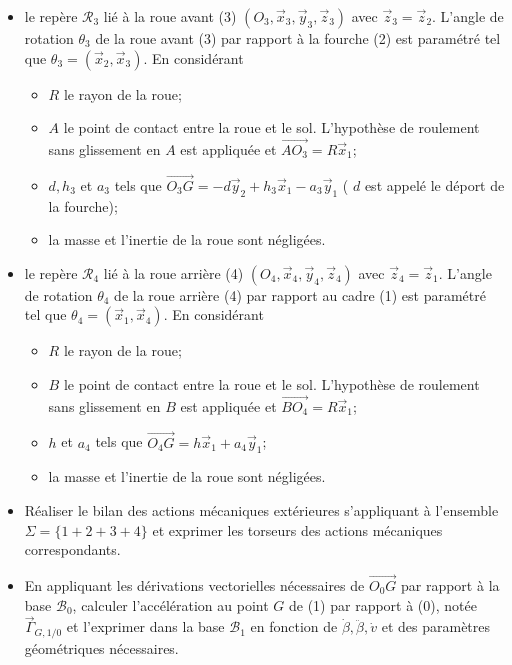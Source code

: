 \documentclass[10pt]{article}
\begin{document}
\begin{itemize}
  \item[-] le repère $\mathcal{R}_{3}$ lié à la roue avant (3) $\left(O_{3}, \vec{x}_{3}, \vec{y}_{3}, \vec{z}_{3}\right)$ avec $\vec{z}_{3}=\vec{z}_{2}$. L'angle de rotation $\theta_{3}$ de la roue avant (3) par rapport à la fourche (2) est paramétré tel que $\theta_{3}=\left(\vec{x}_{2}, \vec{x}_{3}\right)$. En considérant
  \begin{itemize}
    \item[-] $R$ le rayon de la roue;
    \item[-] $A$ le point de contact entre la roue et le sol. L'hypothèse de roulement sans glissement en $A$ est appliquée et $\overrightarrow{A O_{3}}=R \vec{x}_{1}$;
    \item[-] $d, h_{3}$ et $a_{3}$ tels que $\overrightarrow{O_{3} G}=-d \vec{y}_{2}+h_{3} \vec{x}_{1}-a_{3} \vec{y}_{1}$ ( $d$ est appelé le déport de la fourche);
    \item[-] la masse et l'inertie de la roue sont négligées.
  \end{itemize}
  \item[-] le repère $\mathcal{R}_{4}$ lié à la roue arrière (4) $\left(O_{4}, \vec{x}_{4}, \vec{y}_{4}, \vec{z}_{4}\right)$ avec $\vec{z}_{4}=\vec{z}_{1}$. L'angle de rotation $\theta_{4}$ de la roue arrière (4) par rapport au cadre (1) est paramétré tel que $\theta_{4}=\left(\vec{x}_{1}, \vec{x}_{4}\right)$. En considérant
  \begin{itemize}
    \item[-] $R$ le rayon de la roue;
    \item[-] $B$ le point de contact entre la roue et le sol. L'hypothèse de roulement sans glissement en $B$ est appliquée et $\overrightarrow{B O_{4}}=R \vec{x}_{1}$;
    \item[-] $h$ et $a_{4}$ tels que $\overrightarrow{O_{4} G}=h \vec{x}_{1}+a_{4} \vec{y}_{1}$;
    \item[-] la masse et l'inertie de la roue sont négligées.
  \end{itemize}
  \item[Q5.] Réaliser le bilan des actions mécaniques extérieures s'appliquant à l'ensemble $\Sigma=\{1+2+3+4\}$ et exprimer les torseurs des actions mécaniques correspondants.
  \item[Q6.] En appliquant les dérivations vectorielles nécessaires de $\overrightarrow{O_{0} G}$ par rapport à la base $\mathcal{B}_{0}$, calculer l'accélération au point $G$ de (1) par rapport à (0), notée $\vec{\Gamma}_{G, 1 / 0}$ et l'exprimer dans la base $\mathcal{B}_{1}$ en fonction de $\dot{\beta}, \ddot{\beta}, \dot{v}$ et des paramètres géométriques nécessaires.

\end{itemize}
\end{document}
